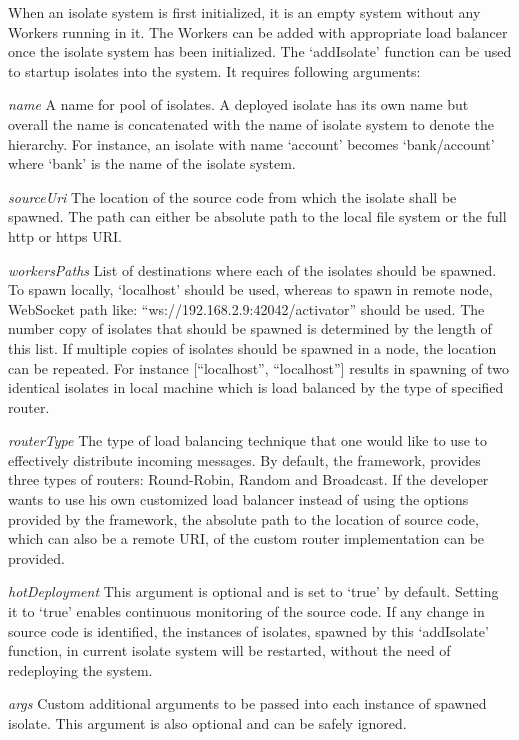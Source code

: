   When an isolate system is first initialized, it is an empty system without any Workers running in it. The Workers can be added with appropriate load balancer once the isolate system has been initialized. The ‘addIsolate’ function can be used to startup isolates into the system. It requires following arguments:
  \begin{description}
    \item{\itshape{name}} \textendash{} A name for pool of isolates. A deployed isolate has its own name but overall the name is concatenated with the name of isolate system to denote the hierarchy. For instance, an isolate with name ‘account’ becomes ‘bank/account’ where ‘bank’ is the name of the isolate system.
    \item{\itshape{sourceUri}} \textendash{} The location of the source code from which the isolate shall be spawned. The path can either be absolute path to the local file system or the full http or https URI.
    \item{\itshape{workersPaths}} \textendash{} List of destinations where each of the isolates should be spawned. To spawn locally, ‘localhost’ should be used, whereas to spawn in remote node, WebSocket path like: “ws://192.168.2.9:42042/activator” should be used. The number copy of isolates that should be spawned is determined by the length of this list. If multiple copies of isolates should be spawned in a node, the location can be repeated. For instance [“localhost”, “localhost”] results in spawning of two identical isolates in local machine which is load balanced by the type of specified router.
    \item{\itshape{routerType}} \textendash{} The type of load balancing technique that one would like to use to effectively distribute incoming messages. By default, the framework, provides three types of routers: Round-Robin, Random and Broadcast. If the developer wants to use his own customized load balancer instead of using the options provided by the framework, the absolute path to the location of source code, which can also be a remote URI, of the custom router implementation can be provided.
    \item{\itshape{hotDeployment}} \textendash{} This argument is optional and is set to ‘true’ by default. Setting it to ‘true’ enables continuous monitoring of the source code. If any change in source code is identified, the  instances of isolates, spawned by this ‘addIsolate’ function, in current isolate system will be restarted, without the need of redeploying the system.
    \item{\itshape{args}} \textendash{} Custom additional arguments to be passed into each instance of spawned isolate. This argument is also optional and can be safely ignored.
  \end{description}

